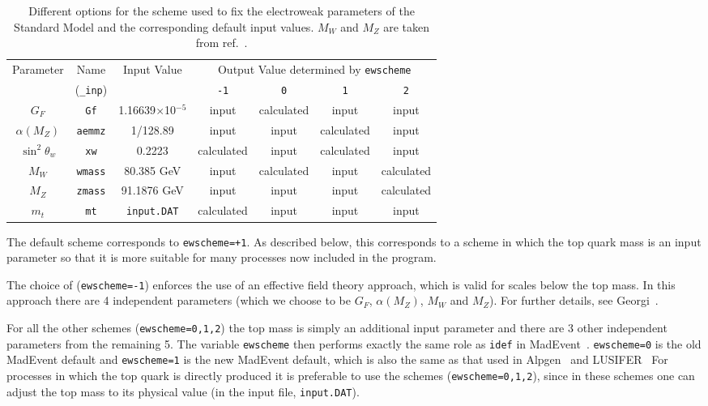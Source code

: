 \documentclass{article}
\begin{document}
\begin{table}
\begin{center}
\begin{tabular}{|c|c|c|c|c|c|c|} \hline
 Parameter & Name & Input Value
 & \multicolumn{4}{c|}{Output Value determined by \tt ewscheme} \\
\cline{4-7}
& ({\tt \_inp}) & & {\tt -1} & {\tt 0} & {\tt 1} & {\tt 2} \\ \hline
$G_F$            & {\tt Gf}      & 1.16639$\times$10$^{-5}$ 
 & input & calculated & input & input \\
$\alpha(M_Z)$    & {\tt aemmz}   & 1/128.89                 
 & input & input & calculated & input \\
$\sin^2 \theta_w$& {\tt xw}      & 0.2223               
 & calculated & input & calculated & input \\
$M_W$            & {\tt wmass}   & 80.385 GeV                
 & input & calculated & input & calculated \\
$M_Z$            & {\tt zmass}   & 91.1876 GeV               
 & input & input & input & calculated \\
$m_t$            & {\tt mt}      & {\tt input.DAT}                  
 & calculated & input & input & input \\
\hline
\end{tabular}
\caption{Different options for the scheme used to fix the electroweak
parameters of the Standard Model and the corresponding default input
values. $M_W$ and $M_Z$ are taken from ref.~\cite{Amsler:2008zzb}.}
\label{ewscheme}
\end{center}
\end{table}

The default scheme corresponds to {\tt ewscheme=+1}. As described below, this corresponds to a scheme
in which the top quark mass is an input parameter so that it is
more suitable for many processes now included in the program.

The choice of ({\tt ewscheme=-1}) enforces the use of an effective field
theory approach, which is valid for scales below the top mass. In this
approach there are 4 independent parameters (which we choose to be
$G_F$, $\alpha(M_Z)$, $M_W$ and $M_Z$). For further details,
see Georgi~\cite{Georgi:1991ci}.

For all the other schemes ({\tt ewscheme=0,1,2}) the top mass is simply
an additional input parameter and there are 3 other independent
parameters from the remaining 5. The variable {\tt ewscheme} then performs
exactly the same role as {\tt idef} in MadEvent~\cite{Maltoni:2002qb}.
{\tt ewscheme=0} is the old MadEvent default and {\tt ewscheme=1} is the
new MadEvent default, which is also the same as that used in 
Alpgen~\cite{Alpgen} and LUSIFER~\cite{Lusifer} 
For processes in which the top quark is directly produced  it is 
preferable to use  the schemes ({\tt ewscheme=0,1,2}), since in these schemes
one can adjust the top mass to its physical value (in the input file,
{\tt input.DAT}).
\end{document}
